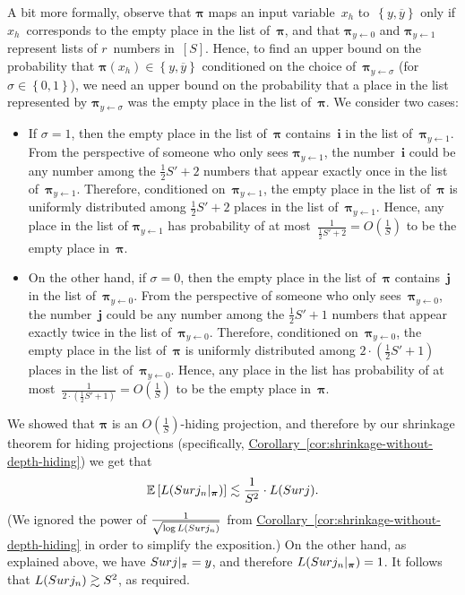 \documentclass[11pt]{article}
\numberwithin{equation}{section}
\theoremstyle{definition}
\theoremstyle{plain}
\newcommand{\expref}[2]{\hyperref[#2]{#1~\ref{#2}}}
\theoremstyle{definition}\newtheorem{notation}[theorem]{Notation}\theoremstyle{plain}
\newcommand{\E}{\mathbb{E}}
\newcommand{\B}{\left\{ 0,1 \right \}}
\newcommand{\p}{\boldsymbol{\pi}}
\newcommand{\surj}{\textup{\textsf{Surj}}}
\renewcommand{\i}{\boldsymbol{i}}
\renewcommand{\j}{\boldsymbol{j}}
\theoremstyle{definition}
\theoremstyle{plain}
\begin{document}
A bit more formally, observe that $\p$ maps an input variable~$x_{h}$
to~$\left\{ y,\overline{y}\right\} $ only if $x_{h}$~corresponds
to the empty place in the list of~$\p$, and that $\p_{y\gets0}$
and $\p_{y\gets1}$ represent lists of $r$~numbers in~$\left[S\right]$.
Hence, to %
find an upper bound on  %
the probability that 
$\p(x_{h})\in\left\{ y,\overline{y}\right\} $
conditioned on the choice of~$\p_{y\gets\sigma}$ (for $\sigma\in\B$),
we %
need an upper bound on  %
the probability that a place in the list represented
by $\p_{y\gets\sigma}$ was the empty place in the list of~$\p$.
We consider two cases:
\begin{itemize}
\item If $\sigma=1$, then the empty place in the list of~$\p$ contains~$\i$
in the list of~$\p_{y\gets1}$. From the perspective of someone who
only sees $\p_{y\gets1}$, the number~$\i$ could be any number among
the $\frac{1}{2}S'+2$ numbers that appear exactly once in the list
of~$\p_{y\gets1}$. Therefore, conditioned on~$\p_{y\gets1}$, the
empty place in the list of~$\p$ is uniformly distributed among $\frac{1}{2}S'+2$
places in the list of~$\p_{y\gets1}$. Hence, any place in the list
of $\p_{y\gets1}$ has probability of at most~$\frac{1}{\frac{1}{2}S'+2}=O\left(\frac{1}{S}\right)$
to be the empty place in~$\p$.
\item On the other hand, if $\sigma=0$, %
%
%
%
then the empty place in the list
of~$\p$ contains~$\j$ in the list of~$\p_{y\gets0}$. From the
perspective of someone who only sees~$\p_{y\gets0}$, the number~$\j$
could be any number among the $\frac{1}{2}S'+1$ numbers that appear
exactly twice in the list of~$\p_{y\gets0}$. Therefore, conditioned
on~$\p_{y\gets0}$, the empty place in the list of~$\p$ is uniformly
distributed among $2\cdot\left(\frac{1}{2}S'+1\right)$ places in
the list of~$\p_{y\gets0}$. Hence, any place in the list has probability
of at most~$\frac{1}{2\cdot\left(\frac{1}{2}S'+1\right)}=O\left(\frac{1}{S}\right)$
to be the empty place in~$\p$.
\end{itemize}
We showed that $\p$ is an $O(\frac{1}{S})$-hiding projection, and
therefore by our shrinkage theorem for hiding projections (specifically,
\expref{Corollary}{cor:shrinkage-without-depth-hiding}) we get that
\[
\E\left[L(\surj_{n}|_{\p})\right]\lesssim\frac{1}{S^{2}}\cdot L(\surj).
\]
(We ignored the power of $\frac{1}{\sqrt{\log L(\surj_{n})}}$ from
\expref{Corollary}{cor:shrinkage-without-depth-hiding} in order to simplify the exposition.)
On the other hand, as explained above, we have $\surj|_{\pi}=y$,
and therefore $L(\surj_{n}|_{\p})=1$. It follows that $L(\surj_{n})\gtrsim S^{2}$, as
required.
\end{document}
